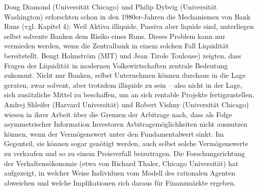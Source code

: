 Doug
Diamond (Universität Chicago) und Philip Dybvig (Universität Washington) erforschten
schon in den 1980er-Jahren die Mechanismen von Bank Runs (vgl. Kapitel 4): Weil
Aktiva illiquide, Passiva aber liquide sind, unterliegen selbst solvente Banken dem
Risiko eines Runs. Dieses Problem kann nur vermieden werden, wenn die Zentralbank
in einem solchen Fall Liquidität bereitstellt. Bengt Holmström (MIT) und Jean Tirole
Toulouse) zeigten, dass Fragen der Liquidität in modernen Volkswirtschaften zentrale
Bedeutung zukommt. Nicht nur Banken, selbst Unternehmen können durchaus in die
Lage geraten, zwar solvent, aber trotzdem illiquide zu sein – also nicht in der Lage, sich
zusätzliche Mittel zu beschaffen, um an sich rentable Projekte fertigzustellen. Andrej
Shleifer (Harvard Universität) und Robert Vishny (Universität Chicago) wiesen in ihrer
Arbeit über die Grenzen der Arbitrage nach, dass als Folge asymmetrischer Information
Investoren Arbitragemöglichkeiten nicht ausnutzen können, wenn der Vermögenswert
unter den Fundamentalwert sinkt. Im Gegenteil, sie können sogar genötigt werden, auch
selbst solche Vermögenswerte zu verkaufen und so zu einem Preisverfall beizutragen.
Die Forschungsrichtung der Verhaltensökonomie (etwa von Richard Thaler, Chicago
Universität) hat aufgezeigt, in welcher Weise Individuen vom Modell des rationalen
Agenten abweichen und welche Implikationen sich daraus für Finanzmärkte ergeben.